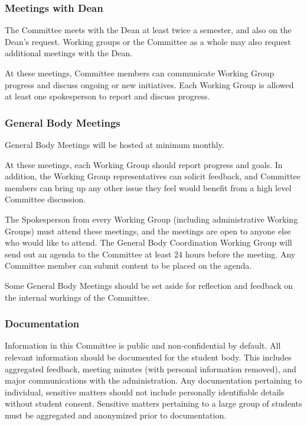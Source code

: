 \documentclass{article}
\begin{document}
\subsubsection{Meetings with Dean} 
The Committee meets with the Dean at least twice a semester, and also on the Dean's request. Working groups or the Committee as a whole may also request additional meetings with the Dean.

At these meetings, Committee members can communicate Working Group progress and discuss ongoing or new initiatives.
Each Working Group is allowed at least one spokesperson to report and discuss progress.%

\subsubsection{General Body Meetings} \label{sec:GBM} 

General Body Meetings will be hosted at minimum monthly.

At these meetings, each Working Group should report progress and goals. In addition, the Working Group representatives can solicit feedback, and Committee members can bring up any other issue they feel would benefit from a high level Committee discussion.

The Spokesperson from every Working Group (including administrative Working Groups) must attend these meetings, and the meetings are open to anyone else who would like to attend.
The General Body Coordination Working Group will send out an agenda to the Committee at least 24 hours before the meeting.
Any Committee member can submit content to be placed on the agenda.

Some General Body Meetings should be set aside for reflection and feedback on the internal workings of the Committee.

\subsubsection{Documentation}

Information in this Committee is public and non-confidential by default. All relevant information should be documented for the student body. This includes aggregated feedback, meeting minutes (with personal information removed), and major communications with the administration. Any documentation pertaining to individual, sensitive matters should not include personally identifiable details without student consent. Sensitive matters pertaining to a large group of students must be aggregated and anonymized prior to documentation.
\end{document}
